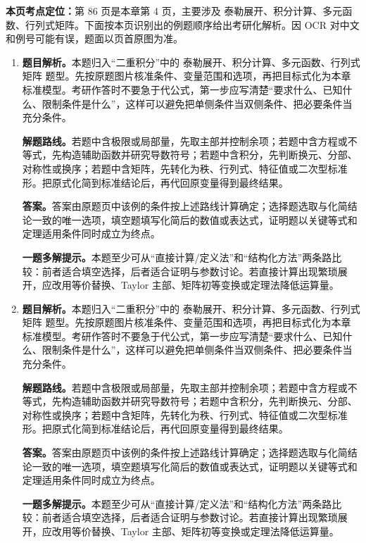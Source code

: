 \begin{solutionblock}
\textbf{本页考点定位：}第 86 页是本章第 4 页，主要涉及 泰勒展开、积分计算、多元函数、行列式矩阵。下面按本页识别出的例题顺序给出考研化解析。因 OCR 对中文和例号可能有误，题面以页首原图为准。

\begin{enumerate}[label=\textbf{例\arabic*.}, leftmargin=2.4em]

\item \textbf{题目解析。}本题归入“二重积分”中的 泰勒展开、积分计算、多元函数、行列式矩阵 题型。先按原题图片核准条件、变量范围和选项，再把目标式化为本章标准模型。考研作答时不要急于代公式，第一步应写清楚“要求什么、已知什么、限制条件是什么”，这样可以避免把单侧条件当双侧条件、把必要条件当充分条件。

\textbf{解题路线。}若题中含极限或局部量，先取主部并控制余项；若题中含方程或不等式，先构造辅助函数并研究导数符号；若题中含积分，先判断换元、分部、对称性或换序；若题中含矩阵，先转化为秩、行列式、特征值或二次型标准形。把原式化简到标准结论后，再代回原变量得到最终结果。

\textbf{答案。}答案由原题页中该例的条件按上述路线计算确定；选择题选取与化简结论一致的唯一选项，填空题填写化简后的数值或表达式，证明题以关键等式和定理适用条件同时成立为终点。

\textbf{一题多解提示。}本题至少可从“直接计算/定义法”和“结构化方法”两条路比较：前者适合填空选择，后者适合证明与参数讨论。若直接计算出现繁琐展开，应改用等价替换、Taylor 主部、矩阵初等变换或定理法降低运算量。

\item \textbf{题目解析。}本题归入“二重积分”中的 泰勒展开、积分计算、多元函数、行列式矩阵 题型。先按原题图片核准条件、变量范围和选项，再把目标式化为本章标准模型。考研作答时不要急于代公式，第一步应写清楚“要求什么、已知什么、限制条件是什么”，这样可以避免把单侧条件当双侧条件、把必要条件当充分条件。

\textbf{解题路线。}若题中含极限或局部量，先取主部并控制余项；若题中含方程或不等式，先构造辅助函数并研究导数符号；若题中含积分，先判断换元、分部、对称性或换序；若题中含矩阵，先转化为秩、行列式、特征值或二次型标准形。把原式化简到标准结论后，再代回原变量得到最终结果。

\textbf{答案。}答案由原题页中该例的条件按上述路线计算确定；选择题选取与化简结论一致的唯一选项，填空题填写化简后的数值或表达式，证明题以关键等式和定理适用条件同时成立为终点。

\textbf{一题多解提示。}本题至少可从“直接计算/定义法”和“结构化方法”两条路比较：前者适合填空选择，后者适合证明与参数讨论。若直接计算出现繁琐展开，应改用等价替换、Taylor 主部、矩阵初等变换或定理法降低运算量。


\end{enumerate}
\end{solutionblock}
